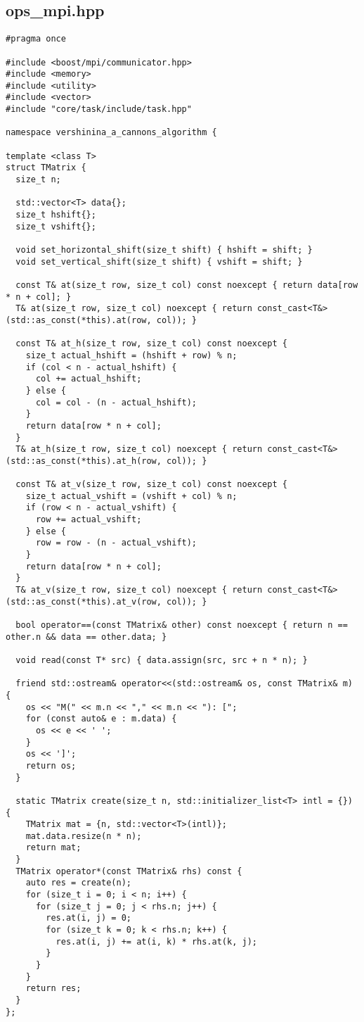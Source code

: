 \documentclass[12pt]{article}
\begin{document}
\subsection{ops\_mpi.hpp}
\begin{lstlisting}
#pragma once

#include <boost/mpi/communicator.hpp>
#include <memory>
#include <utility>
#include <vector>
#include "core/task/include/task.hpp"

namespace vershinina_a_cannons_algorithm {

template <class T>
struct TMatrix {
  size_t n;

  std::vector<T> data{};
  size_t hshift{};
  size_t vshift{};

  void set_horizontal_shift(size_t shift) { hshift = shift; }
  void set_vertical_shift(size_t shift) { vshift = shift; }

  const T& at(size_t row, size_t col) const noexcept { return data[row * n + col]; }
  T& at(size_t row, size_t col) noexcept { return const_cast<T&>(std::as_const(*this).at(row, col)); }

  const T& at_h(size_t row, size_t col) const noexcept {
    size_t actual_hshift = (hshift + row) % n;
    if (col < n - actual_hshift) {
      col += actual_hshift;
    } else {
      col = col - (n - actual_hshift);
    }
    return data[row * n + col];
  }
  T& at_h(size_t row, size_t col) noexcept { return const_cast<T&>(std::as_const(*this).at_h(row, col)); }

  const T& at_v(size_t row, size_t col) const noexcept {
    size_t actual_vshift = (vshift + col) % n;
    if (row < n - actual_vshift) {
      row += actual_vshift;
    } else {
      row = row - (n - actual_vshift);
    }
    return data[row * n + col];
  }
  T& at_v(size_t row, size_t col) noexcept { return const_cast<T&>(std::as_const(*this).at_v(row, col)); }

  bool operator==(const TMatrix& other) const noexcept { return n == other.n && data == other.data; }

  void read(const T* src) { data.assign(src, src + n * n); }

  friend std::ostream& operator<<(std::ostream& os, const TMatrix& m) {
    os << "M(" << m.n << "," << m.n << "): [";
    for (const auto& e : m.data) {
      os << e << ' ';
    }
    os << ']';
    return os;
  }

  static TMatrix create(size_t n, std::initializer_list<T> intl = {}) {
    TMatrix mat = {n, std::vector<T>(intl)};
    mat.data.resize(n * n);
    return mat;
  }
  TMatrix operator*(const TMatrix& rhs) const {
    auto res = create(n);
    for (size_t i = 0; i < n; i++) {
      for (size_t j = 0; j < rhs.n; j++) {
        res.at(i, j) = 0;
        for (size_t k = 0; k < rhs.n; k++) {
          res.at(i, j) += at(i, k) * rhs.at(k, j);
        }
      }
    }
    return res;
  }
};


\end{lstlisting}
\end{document}
